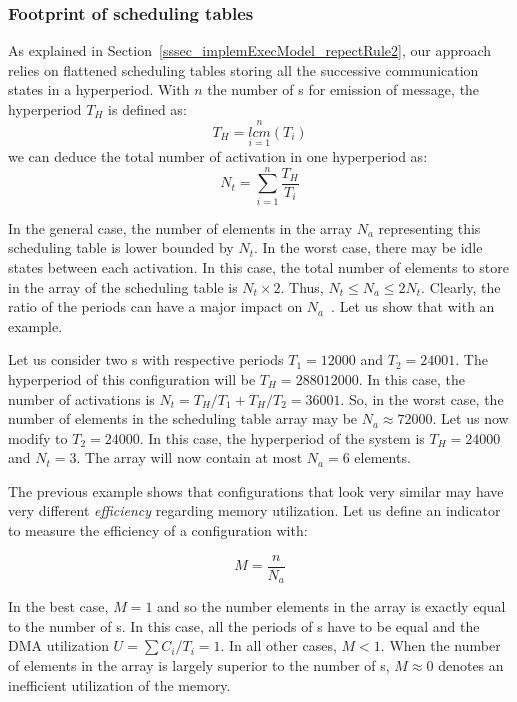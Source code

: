 \documentclass[main.tex]{subfiles}
\begin{document}
\subsubsection{Footprint of scheduling tables}
As explained in Section~\ref{sssec_implemExecModel_repectRule2}, our approach relies on flattened scheduling tables storing all the successive communication states in a hyperperiod. With $n$ the number of \PC{}s for emission of message, the hyperperiod $T_H$ is defined as:
\begin{displaymath}
    T_H = \underset{i=1}{\overset{n}{lcm}} (T_i)
\end{displaymath}
we can deduce the total number of \PC{} activation in one hyperperiod as:
\begin{displaymath}
    N_t = \underset{i=1}{\overset{n}{\sum}} \dfrac{T_H}{T_i}
\end{displaymath}

In the general case, the number of elements in the array $N_a$ representing this scheduling table is lower bounded by $N_t$. In the worst case, there may be idle states between each \PC{} activation. In this case, the total number of elements to store in the array of the scheduling table is $N_t \times 2$. Thus, $N_t \leq N_a \leq 2N_t$. Clearly, the ratio of the periods can have a major impact on $N_a$~\cite{Nasri2016, Mohaqeqi2016}. Let us show that with an example.

\begin{example}
    Let us consider two \PC{}s with respective periods $T_1 = 12000$ and $T_2 = 24001$. The hyperperiod of this configuration will be $T_H = 288012000$. In this case, the number of \PC{} activations is $N_t = T_H / T_1 + T_H / T_2 = 36001$. So, in the worst case, the number of elements in the scheduling table array may be $N_a\approx 72000$. Let us now modify to $T_2 = 24000$. In this case, the hyperperiod of the system is $T_H = 24000$ and $N_t = 3$. The array will now contain at most $N_a = 6$ elements.
\end{example}

The previous example shows that \PC{} configurations that look very similar may have very different \emph{efficiency} regarding memory utilization. Let us define an indicator to measure the efficiency of a configuration with:

\begin{displaymath}
    M = \dfrac{n}{N_a}
\end{displaymath}

In the best case, $M=1$ and so the number elements in the array is exactly equal to the number of \PC{}s. In this case, all the periods of \PC{}s have to be equal and the DMA utilization $U = \sum C_i / T_i = 1$. In all other cases, $M<1$. When the number of elements in the array is largely superior to the number of \PC{}s, $M \approx 0$ denotes an inefficient utilization of the memory.
\end{document}
